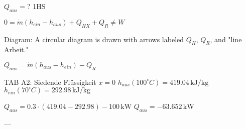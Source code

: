 \( Q_{aus} = ? \)  
1HS  

\( 0 = \dot{m} (h_{ein} - h_{aus}) + Q_{HX} + Q_R \neq W \)  

Diagram: A circular diagram is drawn with arrows labeled \( Q_H \), \( Q_R \), and "line Arbeit."  

\( Q_{aus} = \dot{m} (h_{aus} - h_{ein}) - Q_R \)  

TAB A2: Siedende Flüssigkeit \( x = 0 \)  
\( h_{aus} (100^\circ C) = 419.04 \, \text{kJ/kg} \)  
\( h_{ein} (70^\circ C) = 292.98 \, \text{kJ/kg} \)  

\( Q_{aus} = 0.3 \cdot (419.04 - 292.98) - 100 \, \text{kW} \)  
\( Q_{aus} = -63.652 \, \text{kW} \)  

---